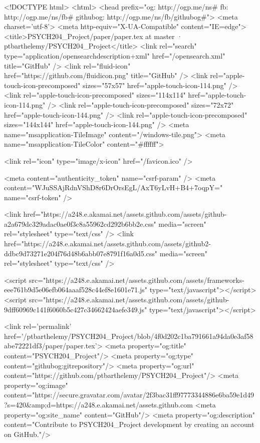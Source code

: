   


<!DOCTYPE html>
<html>
  <head prefix="og: http://ogp.me/ns# fb: http://ogp.me/ns/fb# githubog: http://ogp.me/ns/fb/githubog#">
    <meta charset='utf-8'>
    <meta http-equiv="X-UA-Compatible" content="IE=edge">
        <title>PSYCH204_Project/paper/paper.tex at master · ptbarthelemy/PSYCH204_Project</title>
    <link rel="search" type="application/opensearchdescription+xml" href="/opensearch.xml" title="GitHub" />
    <link rel="fluid-icon" href="https://github.com/fluidicon.png" title="GitHub" />
    <link rel="apple-touch-icon-precomposed" sizes="57x57" href="apple-touch-icon-114.png" />
    <link rel="apple-touch-icon-precomposed" sizes="114x114" href="apple-touch-icon-114.png" />
    <link rel="apple-touch-icon-precomposed" sizes="72x72" href="apple-touch-icon-144.png" />
    <link rel="apple-touch-icon-precomposed" sizes="144x144" href="apple-touch-icon-144.png" />
    <meta name="msapplication-TileImage" content="/windows-tile.png">
    <meta name="msapplication-TileColor" content="#ffffff">

    
    
    <link rel="icon" type="image/x-icon" href="/favicon.ico" />

    <meta content="authenticity_token" name="csrf-param" />
<meta content="WJuSSAjRdnVShD8r6DrOrsEgL/AxT6yLvH+B4+7oqpY=" name="csrf-token" />

    <link href="https://a248.e.akamai.net/assets.github.com/assets/github-a2a679dc329adac0ae0f3c8a55962cd292b6bb2e.css" media="screen" rel="stylesheet" type="text/css" />
    <link href="https://a248.e.akamai.net/assets.github.com/assets/github2-ddbc9d73271e204f76d48b6abb07e8791f16a0d5.css" media="screen" rel="stylesheet" type="text/css" />
    


    <script src="https://a248.e.akamai.net/assets.github.com/assets/frameworks-eee761b9d5e06efb064aaaf528c44ef8e1601e71.js" type="text/javascript"></script>
    <script src="https://a248.e.akamai.net/assets.github.com/assets/github-9dff60969c141f6060b5c427c34662424aefe349.js" type="text/javascript"></script>
    

      <link rel='permalink' href='/ptbarthelemy/PSYCH204_Project/blob/4f0d202c1ba791661a94da0e3af58abe72221df3/paper/paper.tex'>
    <meta property="og:title" content="PSYCH204_Project"/>
    <meta property="og:type" content="githubog:gitrepository"/>
    <meta property="og:url" content="https://github.com/ptbarthelemy/PSYCH204_Project"/>
    <meta property="og:image" content="https://secure.gravatar.com/avatar/2f3bac31ff97773344886e6ba59e1d49?s=420&amp;d=https://a248.e.akamai.net/assets.github.com%
    <meta property="og:site_name" content="GitHub"/>
    <meta property="og:description" content="Contribute to PSYCH204_Project development by creating an account on GitHub."/>

